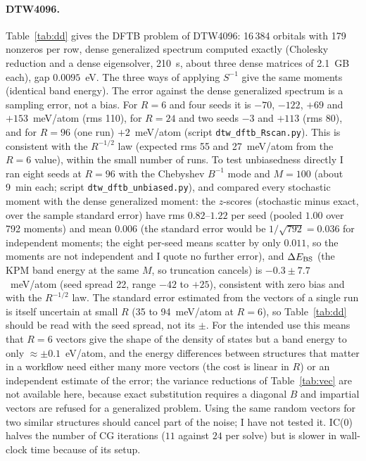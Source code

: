 \documentclass[reprint,nofootinbib,superscriptaddress,amsmath,amssymb,aps,prb,floatfix]{revtex4-2}
\begin{document}
\paragraph*{DTW4096.}
Table~\ref{tab:dd} gives the DFTB problem of DTW4096: 16\,384 orbitals with 179 nonzeros per row, dense generalized spectrum computed exactly (Cholesky reduction and a dense eigensolver, 210~s, about three dense matrices of 2.1~GB each), gap $0.0095$~eV.
The three ways of applying $S^{-1}$ give the same moments (identical band energy). The error against the dense generalized spectrum is a sampling error, not a bias. For $R=6$ and four seeds it is $-70$, $-122$, $+69$ and $+153$~meV/atom (rms 110), for $R=24$ and two seeds $-3$ and $+113$ (rms 80), and for $R=96$ (one run) $+2$~meV/atom (script \texttt{dtw\_dftb\_Rscan.py}). This is consistent with the $R^{-1/2}$ law (expected rms 55 and 27~meV/atom from the $R=6$ value), within the small number of runs. To test unbiasedness directly I ran eight seeds at $R=96$ with the Chebyshev $B^{-1}$ mode and $M=100$ (about 9~min each; script \texttt{dtw\_dftb\_unbiased.py}), and compared every stochastic moment with the dense generalized moment: the $z$-scores (stochastic minus exact, over the sample standard error) have rms $0.82$--$1.22$ per seed (pooled $1.00$ over 792 moments) and mean $0.006$ (the standard error would be $1/\sqrt{792}=0.036$ for independent moments; the eight per-seed means scatter by only $0.011$, so the moments are not independent and I quote no further error), and $\Delta E_{\rm BS}$ (the KPM band energy at the same $M$, so truncation cancels) is $-0.3\pm7.7$~meV/atom (seed spread 22, range $-42$ to $+25$), consistent with zero bias and with the $R^{-1/2}$ law. The standard error estimated from the vectors of a single run is itself uncertain at small $R$ (35 to 94~meV/atom at $R=6$), so Table~\ref{tab:dd} should be read with the seed spread, not its $\pm$. For the intended use this means that $R=6$ vectors give the shape of the density of states but a band energy to only $\approx\pm0.1$~eV/atom, and the energy differences between structures that matter in a workflow need either many more vectors (the cost is linear in $R$) or an independent estimate of the error; the variance reductions of Table~\ref{tab:vec} are not available here, because exact substitution requires a diagonal $B$ and impartial vectors are refused for a generalized problem. Using the same random vectors for two similar structures should cancel part of the noise; I have not tested it. IC(0) halves the number of CG iterations ($11$ against $24$ per solve) but is slower in wall-clock time because of its setup.
\end{document}
